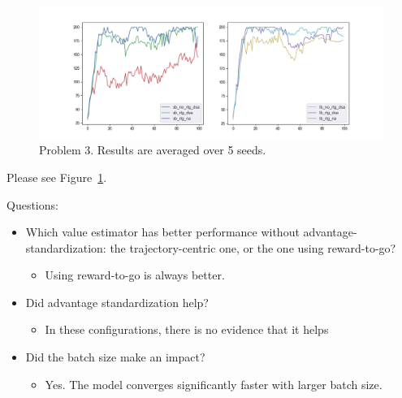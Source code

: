\begin{figure}[htbp]
    \centering
    \includegraphics[width=0.9\linewidth]{figures/p3.png}
    \caption{Problem 3. Results are averaged over 5 seeds.}
    \label{fig:p3}
\end{figure}
Please see Figure~\ref{fig:p3}.

Questions:

\begin{itemize}
    \item Which value estimator has better performance without advantage-standardization: the trajectory-centric one, or the one using reward-to-go?
    \begin{itemize}
        \item Using reward-to-go is always better.
    \end{itemize}
    \item Did advantage standardization help?
    \begin{itemize}
        \item In these configurations, there is no evidence that it helps
    \end{itemize}
    \item Did the batch size make an impact?
    \begin{itemize}
        \item Yes. The model converges significantly faster with larger batch size.
    \end{itemize}

\end{itemize}
